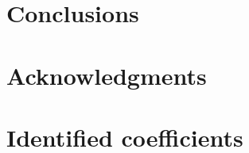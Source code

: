 \documentclass[preprint,11pt,authoryear]{elsarticle}
\begin{document}
\section{Conclusions}
\label{sec:conclusions}

\FloatBarrier

\section*{Acknowledgments}



%


\appendix
\section{Identified coefficients}
\setcounter{table}{0}
\label{sec:coefficients}

\FloatBarrier
\end{document}
